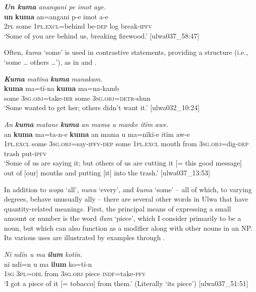 \ea%
    \label{ex:det:199}
          \textit{\textbf{Un kuma} anangani pe imot aye.}\\
\gll    \textbf{un}  \textbf{kuma}  an=angani      p-e    imot  a-e\\
    2\textsc{pl}  some  1\textsc{pl.excl=}behind  be\textsc{{}-dep} log    break-\textsc{ipfv}\\
\glt `Some of you are behind us, breaking firewood.’ [ulwa037\_58:47]
\z

Often, \textit{kuma} ‘some’ is used in contrastive statements, providing a  structure (i.e., ‘some … others …’), as in  and .

\ea%
    \label{ex:det:200}
          \textbf{\textit{Kuma}} \textit{matïna} \textbf{\textit{kuma}} \textit{manakam.}\\
\gll    \textbf{kuma}  ma=tï-na      \textbf{kuma}  ma=na-kamb\\
    some  3\textsc{sg.obj}=take-\textsc{irr}  some  3\textsc{sg.obj}=\textsc{detr-}shun\\
\glt `Some wanted to get her; others didn’t want it.’ [ulwa032\_10:24]
\z

\ea%
    \label{ex:det:201}
          \textit{An} \textbf{\textit{kuma}} \textit{matane} \textbf{\textit{kuma}} \textit{an mama u manke itïm awe.}\\
\gll    an      \textbf{kuma}  ma=ta-n-e          \textbf{kuma}  an mama  u    ma=nïkï-e      itïm  aw-e\\
    1\textsc{pl.excl}  some  3\textsc{sg.obj}=say-\textsc{ipfv-dep}  some  \textsc{1pl.excl}    mouth  from  3\textsc{sg.obj}=dig{}-\textsc{dep}  trash  put\textsc{{}-ipfv}\\
\glt `Some of us are saying it; but others of us are cutting it [= this good message] out of [our] mouths and putting [it] into the trash.’ [ulwa037\_13:53]
\z

In addition to \textit{wopa} ‘all’, \textit{nunu} ‘every’, and \textit{kuma} ‘some’ -- all of which, to varying degrees, behave unusually ally -- there are several other words in Ulwa that have quantity-related meanings. First, the principal means of expressing a small amount or number is the word \textit{ilum} ‘piece’, which I consider primarily to be a noun, but which can also function as a modifier along with other nouns in an NP. Its various uses are illustrated by examples  through .

\ea%
    \label{ex:det:203}
          \textit{Nï ndïn u ma} \textbf{\textit{ilum}} \textit{kotïn.}\\
\gll    nï    ndï=n    u    ma      \textbf{ilum}  ko=tï-n\\
    1\textsc{sg}  3\textsc{pl=obl}  from  3\textsc{sg.obj}  piece  \textsc{indf}=take-\textsc{pfv}\\
\glt `I got a piece of it [= tobacco] from them.’ (Literally ‘its piece’) [ulwa037\_51:51]
\z

